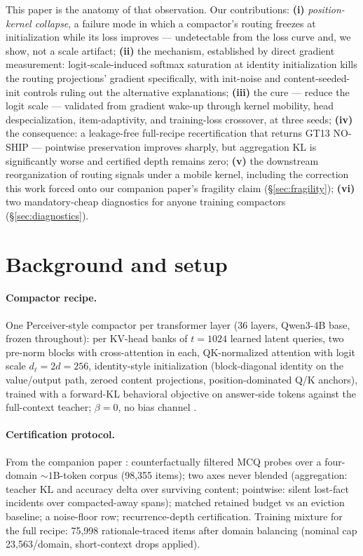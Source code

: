 \documentclass[11pt]{article}
\newcommand{\dl}{d_{\ell}}
\begin{document}
This paper is the anatomy of that observation. Our contributions:
\textbf{(i)} \emph{position-kernel collapse}, a failure mode in which a
compactor's routing freezes at initialization while its loss improves ---
undetectable from the loss curve and, we show, not a scale artifact;
\textbf{(ii)} the mechanism, established by direct gradient measurement:
logit-scale-induced softmax saturation at identity initialization kills
the routing projections' gradient specifically, with init-noise and
content-seeded-init controls ruling out the alternative explanations;
\textbf{(iii)} the cure --- reduce the logit scale --- validated from
gradient wake-up through kernel mobility, head despecialization,
item-adaptivity, and training-loss crossover, at three seeds;
\textbf{(iv)} the consequence: a leakage-free full-recipe recertification
that returns GT13 NO-SHIP --- pointwise preservation improves sharply, but
aggregation KL is significantly worse and certified depth remains zero;
\textbf{(v)} the downstream reorganization of routing
signals under a mobile kernel, including the correction this work forced
onto our companion paper's fragility claim (\S\ref{sec:fragility});
\textbf{(vi)} two mandatory-cheap diagnostics for anyone training
compactors (\S\ref{sec:diagnostics}).

\section{Background and setup}

\paragraph{Compactor recipe.} One Perceiver-style compactor per
transformer layer (36 layers, Qwen3-4B base, frozen throughout): per
KV-head banks of $t{=}1024$ learned latent queries, two pre-norm blocks
with cross-attention in each, QK-normalized attention with logit scale
$\dl = 2d = 256$, identity-style initialization (block-diagonal identity
on the value/output path, zeroed content projections, position-dominated
Q/K anchors), trained with a forward-KL behavioral objective on
answer-side tokens against the full-context teacher; $\beta{=}0$, no bias
channel \citep{oneill2026still}.

\paragraph{Certification protocol.} From the companion paper
\citep{companion2026reading}: counterfactually filtered MCQ probes over a
four-domain ${\sim}1$B-token corpus (98{,}355 items); two axes never
blended (aggregation: teacher KL and accuracy delta over surviving
content; pointwise: silent lost-fact incidents over compacted-away
spans); matched retained budget vs an eviction baseline; a noise-floor
row; recurrence-depth certification. Training mixture for the full
recipe: 75{,}998 rationale-traced items after domain balancing
(nominal cap 23{,}563/domain, short-context drops applied).
\end{document}
